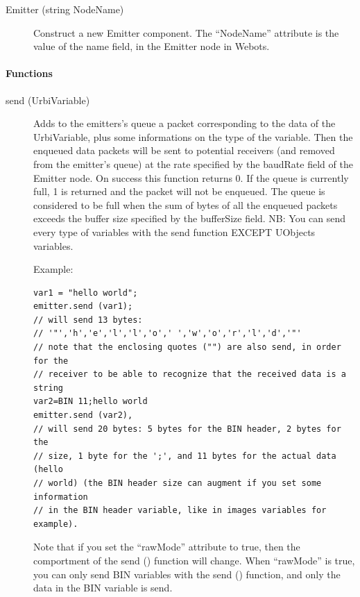 \noindent
\begin{description}
\item[{Emitter (string NodeName)}] Construct a new Emitter component. The ``NodeName'' attribute is the value
          of the name field, in the Emitter node in Webots.

\end{description}

\paragraph{Functions}
\label{webots.uobjects.robotdevices.emitter.functions}%

\noindent
\begin{description}
\item[{send (UrbiVariable)}] Adds to the emitters's queue a packet
  corresponding to the data of the UrbiVariable, plus some
  informations on the type of the variable. Then the enqueued data
  packets will be sent to potential receivers (and removed from the
  emitter's queue) at the rate specified by the baudRate field of the
  Emitter node. On success this function returns 0. If the queue is
  currently full, 1 is returned and the packet will not be
  enqueued. The queue is considered to be full when the sum of bytes
  of all the enqueued packets exceeds the buffer size specified by the
  bufferSize field.  NB: You can send every type of \urbi variables
  with the send function EXCEPT UObjects variables.


          Example:


\begin{lstlisting}
var1 = "hello world";
emitter.send (var1);
// will send 13 bytes:
// '"','h','e','l','l','o',' ','w','o','r','l','d','"'
// note that the enclosing quotes ("") are also send, in order for the
// receiver to be able to recognize that the received data is a string
var2=BIN 11;hello world
emitter.send (var2),
// will send 20 bytes: 5 bytes for the BIN header, 2 bytes for the
// size, 1 byte for the ';', and 11 bytes for the actual data (hello
// world) (the BIN header size can augment if you set some information
// in the BIN header variable, like in images variables for example).
\end{lstlisting}

Note that if you set the ``rawMode'' attribute to true, then the
comportment of the send () function will change. When ``rawMode'' is
true, you can only send BIN variables with the send () function, and
only the data in the BIN variable is send.



\end{description}
